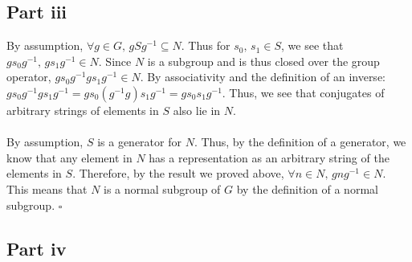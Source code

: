 \documentclass[letterpaper]{article}
\newcommand*{\QED}{\hfill\ensuremath{\square}}%
\begin{document}
\subsection{Part iii}
\label{sub:1Partiii}

By assumption, $ \forall g \in G, \, gSg^{-1} \subseteq N $.
Thus for $ s_0,\, s_1 \in S $, we see that $ gs_0g^{-1},\, gs_1g^{-1} \in N $.
Since $ N $ is a subgroup and is thus closed over the group operator, $ gs_0g^{-1} gs_1g^{-1} \in N $.
By associativity and the definition of an inverse: $ gs_0g^{-1} gs_1g^{-1} = gs_0(g^{-1} g)s_1g^{-1} = gs_0s_1g^{-1} $.
Thus, we see that conjugates of arbitrary strings of elements in $ S $ also lie in $ N $.
\\ \\
By assumption, $ S $ is a generator for $ N $.
Thus, by the definition of a generator, we know that any element in $ N $ has a representation as an arbitrary string of the elements in $ S $.
Therefore, by the result we proved above, $ \forall n \in N,\, gng^{-1} \in N $.
This means that $ N $ is a normal subgroup of $ G $ by the definition of a normal subgroup.
\QED{}

\subsection{Part iv}
\label{sub:1Partiv}
\end{document}
